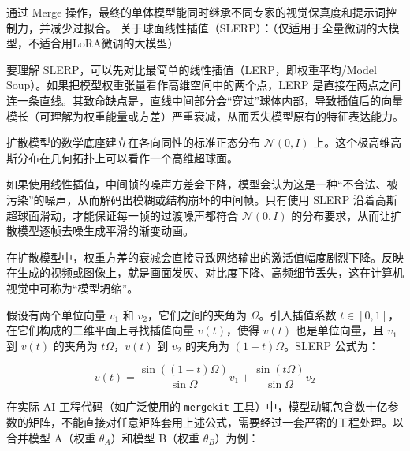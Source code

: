 通过 Merge 操作，最终的单体模型能同时继承不同专家的视觉保真度和提示词控制力，并减少过拟合。
关于球面线性插值（SLERP）：（仅适用于全量微调的大模型，不适合用LoRA微调的大模型）

要理解 SLERP，可以先对比最简单的线性插值（LERP，即权重平均/Model Soup）。如果把模型权重张量看作高维空间中的两个点，LERP 是直接在两点之间连一条直线。其致命缺点是，直线中间部分会``穿过''球体内部，导致插值后的向量模长（可理解为权重能量或方差）严重衰减，从而丢失模型原有的特征表达能力。

扩散模型的数学底座建立在各向同性的标准正态分布 \(\mathcal{N}(0,I)\) 上。这个极高维高斯分布在几何拓扑上可以看作一个高维超球面。

如果使用线性插值，中间帧的噪声方差会下降，模型会认为这是一种``不合法、被污染''的噪声，从而解码出模糊或结构崩坏的中间帧。只有使用 SLERP 沿着高斯超球面滑动，才能保证每一帧的过渡噪声都符合 \(\mathcal{N}(0,I)\) 的分布要求，从而让扩散模型逐帧去噪生成平滑的渐变动画。

在扩散模型中，权重方差的衰减会直接导致网络输出的激活值幅度剧烈下降。反映在生成的视频或图像上，就是画面发灰、对比度下降、高频细节丢失，这在计算机视觉中可称为``模型坍缩''。

假设有两个单位向量 \(v_1\) 和 \(v_2\)，它们之间的夹角为 \(\Omega\)。引入插值系数 \(t\in[0,1]\)，在它们构成的二维平面上寻找插值向量 \(v(t)\)，使得 \(v(t)\) 也是单位向量，且 \(v_1\) 到 \(v(t)\) 的夹角为 \(t\Omega\)，\(v(t)\) 到 \(v_2\) 的夹角为 \((1-t)\Omega\)。SLERP 公式为：

\[
v(t)=\frac{\sin((1-t)\Omega)}{\sin\Omega}v_1+\frac{\sin(t\Omega)}{\sin\Omega}v_2
\]

在实际 AI 工程代码（如广泛使用的 \texttt{mergekit} 工具）中，模型动辄包含数十亿参数的矩阵，不能直接对任意矩阵套用上述公式，需要经过一套严密的工程处理。以合并模型 A（权重 \(\theta_A\)）和模型 B（权重 \(\theta_B\)）为例：

